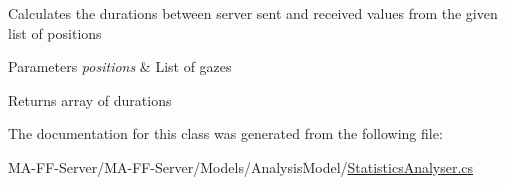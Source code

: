 Calculates the durations between server sent and received values from the given list of positions 


\begin{DoxyParams}{Parameters}
{\em positions} & List of gazes\\
\hline
\end{DoxyParams}
\begin{DoxyReturn}{Returns}
array of durations
\end{DoxyReturn}


The documentation for this class was generated from the following file\+:\begin{DoxyCompactItemize}
\item 
M\+A-\/\+F\+F-\/\+Server/\+M\+A-\/\+F\+F-\/\+Server/\+Models/\+Analysis\+Model/\hyperlink{_statistics_analyser_8cs}{Statistics\+Analyser.\+cs}\end{DoxyCompactItemize}
